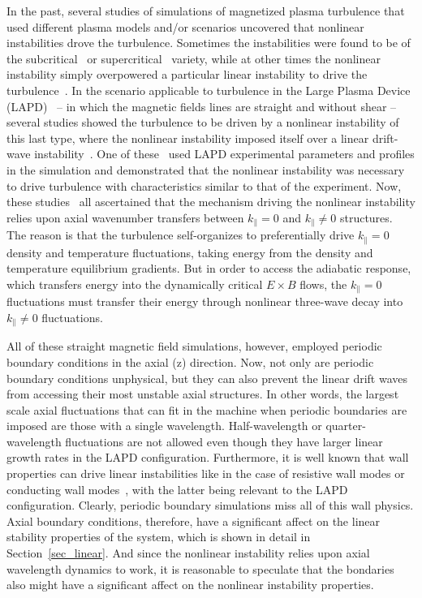 \documentclass[showpacs,preprintnumbers,amsmath,amssymb,superscriptaddress,aip]{revtex4-1}
\def\para{\parallel}
\begin{document}
In the past, several studies of simulations of magnetized plasma turbulence that used different plasma models and/or scenarios uncovered that nonlinear instabilities drove the turbulence. 
Sometimes the instabilities were found to be of the subcritical~\cite{waltz1985,scott1990,scott1992,nordman1993,itoh1996,highcock2012} or supercritical~\cite{dimits2000,ernst2004} variety, 
while at other times the nonlinear instability simply overpowered a particular linear instability to drive the 
turbulence~\cite{biskamp1995,drake1995,zeiler1996,zeiler1997,korsholm1999,scott2002,scott2003,scott2005,friedman2012b}. In the scenario applicable to turbulence in
the Large Plasma Device (LAPD)~\cite{Gekelman1991} -- in which the magnetic fields lines are straight and without shear -- several studies showed the turbulence to be driven by a nonlinear instability
of this last type, where the nonlinear instability imposed itself over a linear drift-wave instability~\cite{biskamp1995,drake1995,korsholm1999,friedman2012b}. 
One of these~\cite{friedman2012b} used LAPD experimental parameters and profiles in the simulation and demonstrated
that the nonlinear instability was necessary to drive turbulence with characteristics similar to that of the experiment.
Now, these studies~\cite{biskamp1995,drake1995,korsholm1999,friedman2012b} all ascertained
that the mechanism driving the nonlinear instability relies upon axial wavenumber transfers between $k_\para = 0$ and $k_\para \ne 0$ structures. The reason is that the turbulence self-organizes
to preferentially drive $k_\para = 0$ density and temperature fluctuations, taking energy from the density and temperature equilibrium gradients. But in order to access the adiabatic response,
which transfers energy into the dynamically critical $E \times B$ flows, the $k_\para = 0$ fluctuations must transfer their energy through nonlinear three-wave decay into $k_\para \ne 0$ fluctuations.

All of these straight magnetic field simulations, however, employed periodic boundary conditions in the axial (z) direction. 
Now, not only are periodic boundary conditions unphysical, but they can also prevent the linear drift waves from accessing their most unstable axial structures.
In other words, the largest scale axial fluctuations that can fit in the machine when periodic boundaries are imposed are those with a single wavelength. 
Half-wavelength or quarter-wavelength fluctuations
are not allowed even though they have larger linear growth rates in the LAPD configuration. Furthermore, it is well known that wall properties can drive linear instabilities like in
the case of resistive wall modes or conducting wall modes~\cite{berk1991}, with the latter being relevant to the LAPD configuration. Clearly, periodic boundary simulations miss all of this wall physics.
Axial boundary conditions, therefore, have a significant
affect on the linear stability properties of the system, which is shown in detail in Section~\ref{sec_linear}. And since the nonlinear instability relies upon axial wavelength dynamics to work, it is 
reasonable to speculate that the bondaries also might have a significant affect on the nonlinear instability properties.
\end{document}
